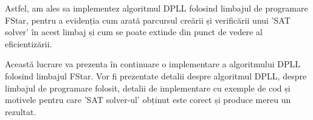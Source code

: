 Astfel, am ales sa implementez algoritmul DPLL folosind limbajul de programare FStar, pentru a evidenția cum arată parcursul creării și verificării unui 'SAT solver' în acest limbaj și cum se poate extinde din punct de vedere al eficientizării.

Această lucrare va prezenta în continuare o implementare a algoritmului DPLL folosind limbajul FStar. Vor fi prezentate detalii despre algoritmul DPLL, despre limbajul de programare folosit, detalii de implementare cu exemple de cod și motivele pentru care 'SAT solver-ul' obținut este corect și produce mereu un rezultat.


